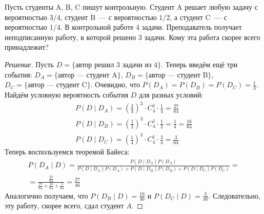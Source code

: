 \documentclass[a4paper,12pt]{article}
\begin{document}
\begin{problem}
	Пусть студенты A, B, C пишут контрольную. Студент A решает любую задачу с вероятностью \(3/4\), студент B~--- с вероятностью \(1/2\), а студент C~--- с вероятностью \(1/4\). В контрольной работе 4 задачи. Преподаватель получает неподписанную работу, в которой решено 3 задачи. Кому эта работа скорее всего принадлежит?
\end{problem}
\begin{proof}[Решение]
	Пусть \(D = \{\text{автор решил 3 задачи из 4}\}\). Теперь введём ещё три события: \(D_A = \{\text{автор~--- студент A}\}\), \(D_B = \{\text{автор~--- студент B}\}\), \(D_C = \{\text{автор~--- студент C}\}\). Очевидно, что \(P(D_A) = P(D_B) = P(D_C) = \frac{1}{3}\). Найдём условную вероятность события \(D\) для разных условий:
	\[\begin{array}{l}
	P(D \mid D_A) = \left(\frac{3}{4}\right)^{3} \cdot C_{4}^{1} \cdot \frac{1}{4}  = \frac{27}{64} \\
	P(D \mid D_B) = \left(\frac{1}{2}\right)^{3} \cdot C_{4}^{1} \cdot \frac{1}{2}  = \frac{1}{4} = \frac{16}{64} \\
	P(D \mid D_C) = \left(\frac{1}{4}\right)^{3} \cdot C_{4}^{1} \cdot \frac{3}{4}  = \frac{3}{64}
	\end{array}\]
	Теперь воспользуемся теоремой Байеса:
	\begin{multline*}
		P(D_A \mid D) = \frac{P(D \mid D_A)P(D_A)}{P(D \mid D_A)P(D_A) + P(D \mid D_B)P(D_B) + P(D \mid D_C)P(D_C)} = \\ = \frac{\frac{27}{64}}{\frac{27}{64} + \frac{16}{64} + \frac{3}{64}} = \frac{27}{46}
	\end{multline*}
	Аналогично получаем, что \(P(D_B \mid D) = \frac{16}{46}\) и \(P(D_C \mid D) = \frac{3}{46}\). Следовательно, эту работу, скорее всего, сдал студент \(A\).
\end{proof}
\end{document}
